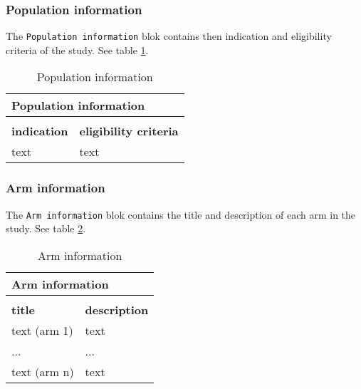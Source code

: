 \documentclass[a4paper,10pt]{article}
\begin{document}
\subsubsection*{Population information}
The \texttt{Population information} blok contains then indication and eligibility criteria of the study. See table \ref{table:Population information}.
\begin{table}[h]
  \centering
  \caption{Population information}
  \label{table:Population information}
  \begin{tabular}{|l|l|}
    \hline
    \multicolumn{2}{|l|}{\textbf{Population information}} \\ \hline
    \multicolumn{2}{|l|}{}                                \\ \hline
    \textbf{indication} & \textbf{eligibility criteria}   \\ \hline
    text & text                                           \\ \hline
  \end{tabular}
\end{table}

\subsubsection*{Arm information}
The \texttt{Arm information} blok contains the title and description of each arm in the study. See table \ref{table:Arm information}.
\begin{table}[h]
  \centering
  \caption{Arm information}
  \label{table:Arm information}
  \begin{tabular}{|l|l|}
    \hline
    \multicolumn{2}{|l|}{\textbf{Arm information}}  \\ \hline
    \multicolumn{2}{|l|}{}                          \\ \hline
    \textbf{title} & \textbf{description}           \\ \hline
    text (arm 1)& text                              \\ \hline
    ... & ...                                       \\ \hline
    text (arm n)& text                              \\ \hline
  \end{tabular}
\end{table}
\end{document}
